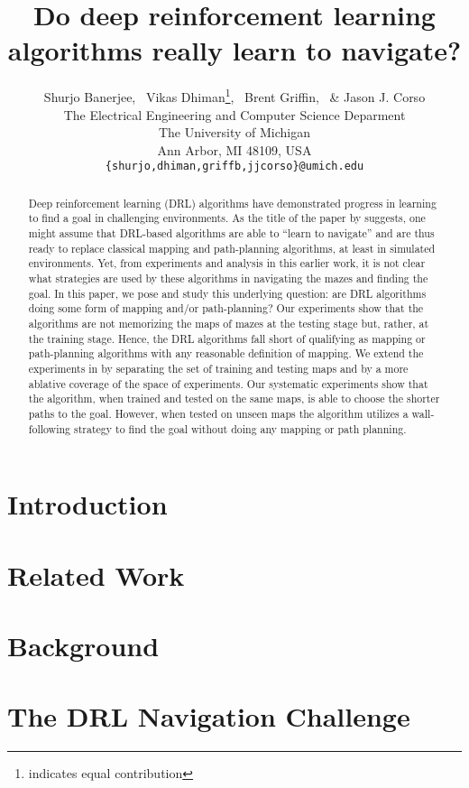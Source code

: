 \documentclass{article} %
\title{Do deep reinforcement learning algorithms really learn to navigate?}
\author{Shurjo Banerjee\footnotemark[1],%
  \, Vikas Dhiman\thanks{indicates equal contribution},%
  \, Brent Griffin,%
  \, \& Jason J. Corso\\
  The Electrical Engineering and Computer Science Deparment\\
The University of Michigan\\
Ann Arbor, MI 48109, USA \\
\texttt{\{shurjo,dhiman,griffb,jjcorso\}@umich.edu} \\
}
\begin{document}
\maketitle
\begin{abstract}
  Deep reinforcement learning (DRL) algorithms have demonstrated progress in learning to find a goal in challenging environments.
  As the title of the paper by \cite{MiPaViICLR2017} suggests, one might assume that DRL-based algorithms are able to ``learn to navigate'' and are thus ready to replace classical mapping and path-planning algorithms, at least in simulated environments.
  Yet, from experiments and analysis in this earlier work, it is not clear what strategies are used by these algorithms in navigating the mazes and finding the goal.
  In this paper, we pose and study this underlying question: are DRL algorithms doing some form of mapping and/or path-planning?  Our experiments show that the algorithms are not memorizing the maps of mazes at the testing stage but, rather, at the training stage.
  Hence, the DRL algorithms fall short of qualifying as mapping or path-planning algorithms with any reasonable definition of mapping.
  We extend the experiments in \cite{MiPaViICLR2017} by separating the set of training and testing maps and by a more ablative coverage of the space of experiments.
  Our systematic experiments show that the \NavAiiiCDiDiiL{} algorithm, when trained and tested on the same maps, is able to choose the shorter paths to the goal.
  However, when tested on unseen maps the algorithm utilizes a wall-following strategy to find the goal without doing any mapping or path planning.
\end{abstract}

\section{Introduction}
%


\section{Related Work}


\section{Background}


\section{The DRL Navigation Challenge}

\end{document}

